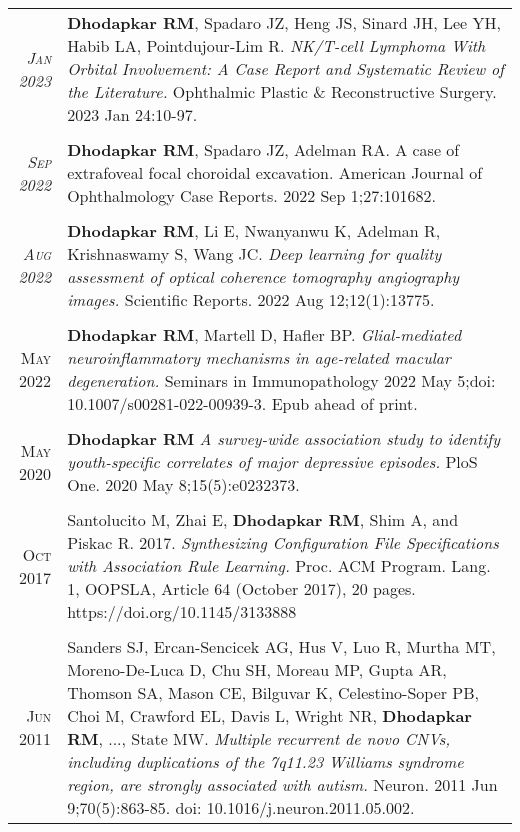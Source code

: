 \documentclass[a4paper,10pt]{article}
\begin{document}
\begin{longtable}{rp{11cm}}
\textit{\textsc{Jan} 2023}& {\bf Dhodapkar RM}, Spadaro JZ, Heng JS, Sinard JH, Lee YH, Habib LA, Pointdujour-Lim R. {\it NK/T-cell Lymphoma With Orbital Involvement: A Case Report and Systematic Review of the Literature.} Ophthalmic Plastic \& Reconstructive Surgery. 2023 Jan 24:10-97.
 \\
\multicolumn{2}{c}{} \\
 \textit{\textsc{Sep} 2022}& {\bf Dhodapkar RM}, Spadaro JZ, Adelman RA. A case of extrafoveal focal choroidal excavation. American Journal of Ophthalmology Case Reports. 2022 Sep 1;27:101682. \\
\multicolumn{2}{c}{} \\
 \textit{\textsc{Aug 2022}}& {\bf Dhodapkar RM}, Li E, Nwanyanwu K, Adelman R, Krishnaswamy S, Wang JC. {\it Deep learning for quality assessment of optical coherence tomography angiography images.} Scientific Reports. 2022 Aug 12;12(1):13775. \\
\multicolumn{2}{c}{} \\
 \textsc{May} 2022 & {\bf Dhodapkar RM}, Martell D, Hafler BP. {\it Glial-mediated neuroinflammatory mechanisms in age-related macular degeneration.} Seminars in Immunopathology 2022 May 5;doi: 10.1007/s00281-022-00939-3. Epub ahead of print. \\
\multicolumn{2}{c}{} \\
 \textsc{May} 2020 & {\bf Dhodapkar RM} {\it A survey-wide association study to identify youth-specific correlates of major depressive episodes.} PloS One. 2020 May 8;15(5):e0232373. \\
\multicolumn{2}{c}{} \\
 \textsc{Oct} 2017 & Santolucito M, Zhai E, {\bf Dhodapkar RM}, Shim A, and Piskac R. 2017. {\it Synthesizing Configuration
File Specifications with Association Rule Learning.} Proc. ACM Program. Lang. 1, OOPSLA, Article 64
(October 2017), 20 pages. https://doi.org/10.1145/3133888 \\
\multicolumn{2}{c}{} \\
 \textsc{Jun} 2011 & Sanders SJ, Ercan-Sencicek AG, Hus V, Luo R, Murtha MT, Moreno-De-Luca D, Chu SH, Moreau MP, Gupta AR, Thomson SA, Mason CE, Bilguvar K, Celestino-Soper PB, Choi M, Crawford EL, Davis L, Wright NR, {\bf Dhodapkar RM}, ..., State MW. {\it Multiple recurrent de novo CNVs, including duplications of the 7q11.23 Williams syndrome region, are strongly associated with autism.} Neuron. 2011 Jun 9;70(5):863-85. doi: 10.1016/j.neuron.2011.05.002. 
\end{longtable}
\end{document}
